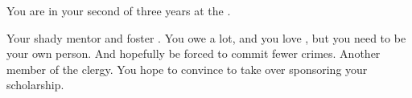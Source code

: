 \documentclass[char]{GL2020}
\begin{document}
\begin{itemz}[Notes]
	\item You are in your second of three years at the \pSchool{}.
\end{itemz}

\begin{contacts}
	\contact{\cAntiChup{}} Your shady mentor and foster \cAntiChup{\parent}. You owe \cAntiChup{\them} a lot, and you love \cAntiChup{\them}, but you need to be your own person. And hopefully be forced to commit fewer crimes.
	\contact{\cBeetle{}} Another member of the \pTech{} clergy. You hope to convince \cBeetle{\them} to take over sponsoring your scholarship.
\end{contacts}
\end{document}
